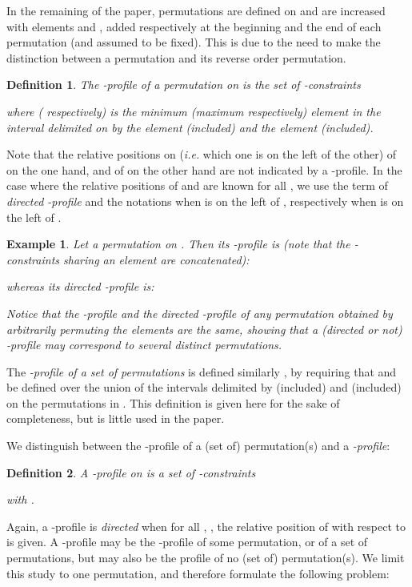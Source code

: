 \documentclass{article}
\newtheorem{defin}{Definition}
\newtheorem{ex}{Example}
\newcommand{\bdefin}{\begin{defin}\rm}
\newcommand{\edefin}{\end{defin} }
\newcommand{\bex}{\begin{ex}\rm}
\newcommand{\eex}{\end{ex}}
\begin{document}
In the remaining of the paper, permutations are defined on  and are increased with elements  and ,
added respectively at the beginning and the end of each permutation (and assumed to be fixed). This is due to the need 
to make the distinction between a permutation and its reverse order permutation. 

\bdefin \cite{IR}
The {\em -profile of a permutation}  on  is the set of {\em -constraints}



\noindent where  ( respectively) is the minimum (maximum respectively) element  
in the interval delimited on  by the element  (included) and the element  (included). 

\edefin

Note that the relative positions on  ({\em i.e.} which one is on the left of the other) of  on the one hand, and of   on the other hand are not indicated by a -profile.
In the case where the relative positions of  and   are
known for all , we use the term of {\em directed -profile} and the notations
 when  is on the left of ,
respectively   when  is on the left of .

\bex
Let  a permutation on . Then its
-profile is (note that the -constraints sharing an element are concatenated): 




\noindent whereas its directed -profile is:



\noindent Notice that the -profile and the directed -profile of any permutation obtained by 
arbitrarily permuting the elements  are the same, showing that a (directed or not) -profile
may correspond to several distinct permutations. 
\eex
The {\em -profile of a set  of permutations} is defined similarly \cite{IR}, by requiring that  
and  be defined over the union of the intervals delimited by  (included) and  (included)
on the  permutations in . This definition is given here for the sake of completeness,
but is little used in the paper.

We distinguish between the -profile of a (set of) permutation(s) and a {\em -profile}:

\bdefin
A {\em -profile} on  is a set of {\em -constraints} 



\noindent with . 
\edefin

Again, a -profile is {\em directed} when for all , , the relative position of  with respect to 
 is given.
A -profile may be the -profile of some permutation, or of a set of permutations, but may  also be the profile 
of no (set of) permutation(s). We limit this study to one permutation, and therefore formulate the following problem:
\newpage
\end{document}
